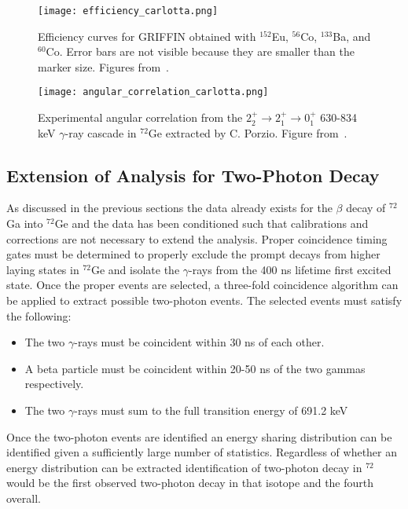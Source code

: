 \documentclass[cnatzke_thesis_proposal.tex]{subfiles}
\begin{document}
\begin{figure}[htbp]
  \centering
  \texttt{[image: efficiency\_carlotta.png]}
  \caption{Efficiency curves for GRIFFIN obtained with $^{152}$Eu, $^{56}$Co, $^{133}$Ba, and $^{60}$Co. Error bars are not visible because they are smaller than the marker size. Figures from~\cite{porzio_configuration_2021}.}
  \label{fig:efficiency_carlotta}
\end{figure}

\begin{figure}[htbp]
  \centering
  \texttt{[image: angular\_correlation\_carlotta.png]}
  \caption{Experimental angular correlation from the $2_2^+ \rightarrow 2_1^+ \rightarrow 0_1^+$ 630-834 keV $\gamma$-ray cascade in $^{72}$Ge extracted by C. Porzio. Figure from~\cite{porzio_configuration_2021}.}
  \label{fig:angular_correlation_carlotta}
\end{figure}


\subsection{Extension of Analysis for Two-Photon Decay}
As discussed in the previous sections the data already exists for the $\beta$ decay of $^{72}$Ga into $^{72}$Ge and the data has been conditioned such that calibrations and corrections are not necessary to extend the analysis. 
Proper coincidence timing gates must be determined to properly exclude the prompt decays from higher laying states in $^{72}$Ge and isolate the $\gamma$-rays from the 400 ns lifetime first excited state. 
Once the proper events are selected, a three-fold coincidence algorithm can be applied to extract possible two-photon events. 
The selected events must satisfy the following: 

\begin{itemize}
  \item The two $\gamma$-rays must be coincident within 30 ns of each other.
  \item A beta particle must be coincident within 20-50 ns of the two gammas respectively.
  \item The two $\gamma$-rays must sum to the full transition energy of 691.2 keV
\end{itemize}

Once the two-photon events are identified an energy sharing distribution can be identified given a sufficiently large number of statistics. 
Regardless of whether an energy distribution can be extracted identification of two-photon decay in $^{72}$ would be the first observed two-photon decay in that isotope and the fourth overall. 


\end{document}
